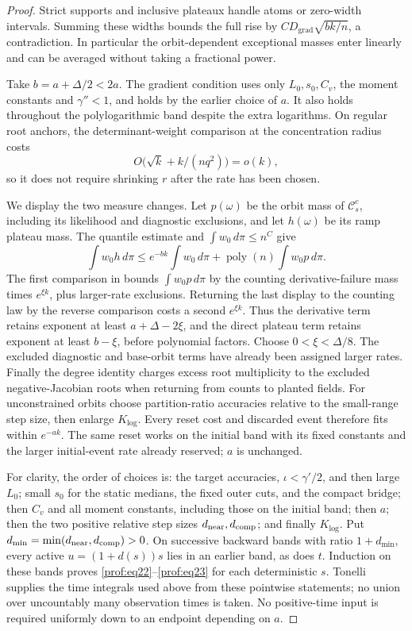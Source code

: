 \begin{proof}
Strict supports and inclusive plateaux handle atoms or zero-width
intervals.  Summing these widths bounds the full rise by
\(CD_{\mathrm{grad}}\sqrt{bk/n}\), a contradiction.
In particular the orbit-dependent exceptional masses enter linearly
and can be averaged without taking a fractional power.

Take \(b=a+\Delta/2<2a\). The gradient condition uses only
\(L_0,s_0,C_v\), the moment constants and \(\gamma''<1\), and
holds by the earlier choice of \(a\). It also
holds throughout the polylogarithmic band despite the extra logarithms.
On regular root anchors, the determinant-weight comparison at the
concentration radius costs
\[
 O\bigl(\sqrt k+k/(nq^2)\bigr)=o(k),
\]
so it does not require shrinking \(r\) after the rate has been chosen.

We display the two measure changes. Let \(p(\omega)\) be the
orbit mass of \(\mathcal C_s^c\), including its likelihood and
diagnostic exclusions, and let \(h(\omega)\) be
its ramp plateau mass. The quantile estimate and
\(\int w_0\,d\pi\le n^C\) give
\[
 \int w_0h\,d\pi
 \le e^{-bk}\int w_0\,d\pi
       +\operatorname{poly}(n)\int w_0p\,d\pi.
\]
The first comparison in  bounds
\(\int w_0p\,d\pi\) by the counting derivative-failure mass
times \(e^{\xi k}\), plus larger-rate exclusions. Returning the
last display to the counting law by the reverse comparison costs
a second \(e^{\xi k}\). Thus the derivative term retains exponent
at least \(a+\Delta-2\xi\), and the direct plateau term retains
exponent at least \(b-\xi\), before polynomial factors. Choose
\(0<\xi<\Delta/8\). The excluded
diagnostic and base-orbit terms have already been assigned larger
rates. Finally the degree identity charges excess root multiplicity
to the excluded negative-Jacobian roots when returning from counts
to planted fields.
For unconstrained orbits choose partition-ratio accuracies relative to
the small-range step size, then enlarge \(K_{\log}\).  Every reset
cost and discarded event therefore fits within \(e^{-ak}\).
The same reset works on the initial band with its fixed constants
and the larger initial-event rate already reserved; \(a\) is unchanged.

For clarity, the order of choices is: the target accuracies,
\(\iota<\gamma'/2\), and then large \(L_0\); small \(s_0\) for the static medians, the fixed outer cuts,
and the compact bridge; then \(C_v\) and all moment constants,
including those on the initial band; then \(a\); then the two
positive relative step sizes \(d_{\rm near},d_{\rm comp}\); and
finally \(K_{\log}\). Put
\(d_{\min}=\min(d_{\rm near},d_{\rm comp})>0\).
On successive backward bands with ratio \(1+d_{\min}\), every
active \(u=(1+d(s))s\) lies in an earlier band, as does \(t\).
Induction on these bands proves \eqref{prof:eq22}--\eqref{prof:eq23}
for each deterministic \(s\). Tonelli supplies the time integrals
used above from these pointwise statements; no union over
uncountably many observation times is taken. No positive-time input
is required uniformly down to an endpoint depending on \(a\).
\end{proof}


